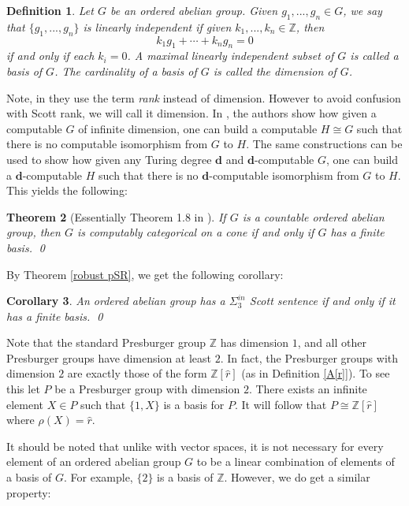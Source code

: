 \documentclass{amsart}%
\newtheorem{theorem}{Theorem}
\numberwithin{theorem}{section}
\newtheorem{corollary}[theorem]{Corollary}
\newtheorem{definition}[theorem]{Definition}
\newcommand{\Z}{\mathbb{Z}}
\newcommand{\0}{\emptyset}
\newcommand{\ddd}{\boldsymbol{d}}
\begin{document}
\begin{definition}
    Let $G$ be an ordered abelian group. Given $g_1,...,g_n\in G$, we say that $\{g_1,...,g_n\}$ is linearly independent if  given $k_1,...,k_n\in \Z$, then $$k_1g_1+\cdots + k_ng_n=0$$ if and only if each $k_i=0$.  A maximal linearly independent subset of $G$ is called a basis of $G$. The cardinality of a basis of $G$ is called the dimension of $G$. 
\end{definition}

Note, in \cite{Reed-et-al} they use the term \emph{rank} instead of dimension. However to avoid confusion with Scott rank, we will call it dimension. 
In \cite{Reed-et-al}, the authors show how given a computable $G$ of infinite dimension, one can build a computable $H\cong G$ such that there is no computable isomorphism from $G$ to $H$. The same constructions can be used to show how given any Turing degree $\ddd$ and $\ddd$-computable $G$, one can build a $\ddd$-computable $H$ such that there is no $\ddd$-computable isomorphism from $G$ to $H$. This yields the following: 

\begin{theorem}[Essentially Theorem 1.8 in \cite{Reed-et-al}]
If $G$ is a countable ordered abelian group, then $G$ is computably categorical on a cone if and only if $G$ has a finite basis. \qed
\end{theorem}

By Theorem \ref{robust pSR}, we get the following corollary:

\begin{corollary}
\label{cor: sigma_3 iff finite basis}
    An ordered abelian group has a $\Sigma^{in}_3$ Scott sentence if and only if it has a finite basis. \qed
\end{corollary}

Note that the standard Presburger group $\Z$ has dimension $1$, and all other Presburger groups have dimension at least $2$. In fact, the Presburger groups with dimension $2$ are exactly those of the form $\Z[\hat r]$ (as in Definition \ref{A[r]}). To see this let $P$ be a Presburger group with dimension $2$. There exists an infinite element $X\in P$ such that $\{1,X\}$ is a basis for $P$. It will follow that $P\cong \Z[\hat r]$ where $\rho(X)=\hat{r}$.

It should be noted that unlike with vector spaces, it is not necessary for every element of an ordered abelian group $G$ to be a linear combination of elements of a basis of $G$. For example, $\{2\}$ is a basis of $\Z$. However, we do get a similar property: 
\end{document}
